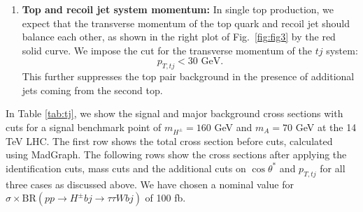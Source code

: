 \begin{enumerate}
\item\textbf{Top and recoil jet system momentum:} In single top production, we expect that the transverse momentum of the top quark and recoil jet should balance each other, as shown in the right plot of Fig.~\ref{fig:fig3} by the red solid curve. We impose the cut for the transverse momentum of the $tj$ system: 
\begin{equation}
p_{T,tj} < 30 \text{ GeV}.
\label{eqPT}
\end{equation}
This further suppresses the top pair background in the presence of additional jets coming from the second top.
 
\end{enumerate}



In Table \ref{tab:tj}, we show the signal and major background cross sections with cuts for a signal benchmark point of $m_{H^{\pm}} = 160$ GeV and $m_A = 70$ GeV at the 14 TeV LHC. The first row shows the total cross section before cuts, calculated using MadGraph. The following rows show the cross sections after applying the identification cuts, mass cuts and the additional cuts on $\cos\theta^*$ and $p_{T,tj}$ for all three cases as discussed above. We have chosen a nominal value for $\sigma \times \text{BR}( p p \rightarrow H^{\pm} b j \rightarrow \tau \tau W bj)$ of 100 fb.


